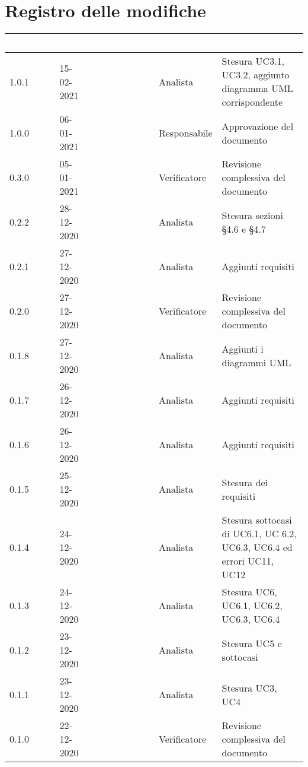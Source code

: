 \section*{Registro delle modifiche}
{
\setcounter{table}{-1}
{
\renewcommand{\arraystretch}{1.5}
\centering
\begin{longtable}{C{1.7cm} C{2.5cm} C{3.2cm} C{2.7cm} C{4.8cm}}
\textcolor{white}{\textbf{Versione}}&
\textcolor{white}{\textbf{Data}}&
\textcolor{white}{\textbf{Nominativo}}&
\textcolor{white}{\textbf{Ruolo}}&
\textcolor{white}{\textbf{Descrizione}}\\	
\endhead

1.0.1 & 15-02-2021 & \SP{} & Analista & Stesura UC3.1, UC3.2, aggiunto diagramma UML corrispondente\\
1.0.0 & 06-01-2021 & \BM{} & Responsabile & Approvazione del documento \\

0.3.0 & 05-01-2021 & \PA{} & Verificatore & Revisione complessiva del documento \\

0.2.2 & 28-12-2020 & \BM{} & Analista & Stesura sezioni §4.6 e §4.7\\
0.2.1 & 27-12-2020 & \SG{} & Analista & Aggiunti requisiti\\

0.2.0 & 27-12-2020 & \RA{} & Verificatore & Revisione complessiva del documento \\

0.1.8 & 27-12-2020 & \SP{} & Analista & Aggiunti i diagrammi UML\\
0.1.7 & 26-12-2020 & \SP{} & Analista & Aggiunti requisiti\\
0.1.6 & 26-12-2020 & \BM{} & Analista & Aggiunti requisiti\\
0.1.5 & 25-12-2020 & \SG{} & Analista & Stesura dei requisiti \\
0.1.4 & 24-12-2020 & \SP{} & Analista & Stesura sottocasi di UC6.1, UC 6.2, UC6.3, UC6.4 ed errori UC11, UC12\\
0.1.3 & 24-12-2020 & \SG{} & Analista & Stesura UC6, UC6.1, UC6.2, UC6.3, UC6.4\\
0.1.2 & 23-12-2020 & \SP{} & Analista & Stesura UC5 e sottocasi\\

0.1.1 & 23-12-2020 & \BM{} & Analista & Stesura UC3, UC4\\

0.1.0 & 22-12-2020 & \PA{} & Verificatore & Revisione complessiva del documento \\


\end{longtable}}}
